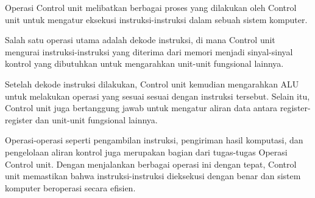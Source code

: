 Operasi Control unit melibatkan berbagai proses yang dilakukan oleh Control unit untuk mengatur eksekusi instruksi-instruksi dalam sebuah sistem komputer.

Salah satu operasi utama adalah dekode instruksi, di mana Control unit mengurai instruksi-instruksi yang diterima dari memori menjadi sinyal-sinyal kontrol yang dibutuhkan untuk mengarahkan unit-unit fungsional lainnya.

Setelah dekode instruksi dilakukan, Control unit kemudian mengarahkan ALU untuk melakukan operasi yang sesuai sesuai dengan instruksi tersebut. Selain itu, Control unit juga bertanggung jawab untuk mengatur aliran data antara register-register dan unit-unit fungsional lainnya.

Operasi-operasi seperti pengambilan instruksi, pengiriman hasil komputasi, dan pengelolaan aliran kontrol juga merupakan bagian dari tugas-tugas Operasi Control unit. Dengan menjalankan berbagai operasi ini dengan tepat, Control unit memastikan bahwa instruksi-instruksi dieksekusi dengan benar dan sistem komputer beroperasi secara efisien.
